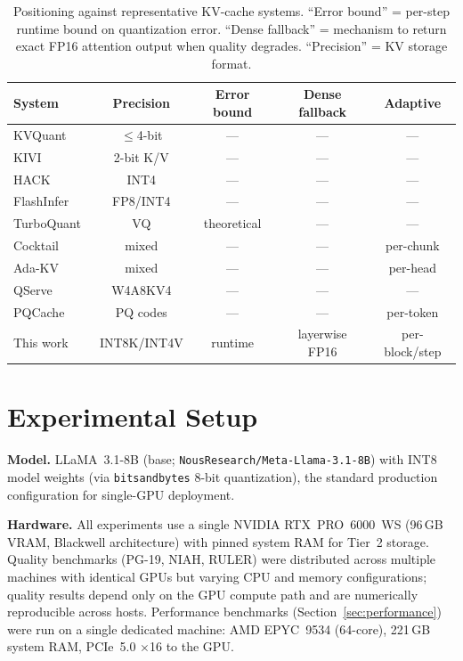 \documentclass[10pt,twocolumn,a4paper]{article}
\theoremstyle{definition}
\theoremstyle{remark}
\begin{document}
\begin{table}[!t]
\centering
\caption{Positioning against representative KV-cache systems.  ``Error bound'' = per-step runtime bound on quantization error.  ``Dense fallback'' = mechanism to return exact FP16 attention output when quality degrades.  ``Precision'' = KV storage format.}
\label{tab:positioning}
\small
\begin{tabular}{lcccc}
\toprule
\textbf{System} & \textbf{Precision} & \textbf{Error bound} & \textbf{Dense fallback} & \textbf{Adaptive} \\
\midrule
KVQuant~\cite{kvquant} & $\leq$4-bit & --- & --- & --- \\
KIVI~\cite{kivi} & 2-bit K/V & --- & --- & --- \\
HACK~\cite{hack} & INT4 & --- & --- & --- \\
FlashInfer~\cite{flashinfer} & FP8/INT4 & --- & --- & --- \\
TurboQuant~\cite{turboquant} & VQ & theoretical & --- & --- \\
Cocktail~\cite{cocktail} & mixed & --- & --- & per-chunk \\
Ada-KV~\cite{adakv} & mixed & --- & --- & per-head \\
QServe~\cite{qserve} & W4A8KV4 & --- & --- & --- \\
PQCache~\cite{pqcache} & PQ codes & --- & --- & per-token \\
\midrule
This work & INT8K/INT4V & runtime & layerwise FP16 & per-block/step \\
\bottomrule
\end{tabular}
\end{table}

\section{Experimental Setup}
\label{sec:setup}

\textbf{Model.}  LLaMA~3.1-8B (base; \texttt{NousResearch/Meta-Llama-3.1-8B}) with INT8 model weights (via \texttt{bitsandbytes} 8-bit quantization), the standard production configuration for single-GPU deployment.

\textbf{Hardware.}  All experiments use a single NVIDIA RTX~PRO~6000~WS (96\,GB VRAM, Blackwell architecture) with pinned system RAM for Tier~2 storage.  Quality benchmarks (PG-19, NIAH, RULER) were distributed across multiple machines with identical GPUs but varying CPU and memory configurations; quality results depend only on the GPU compute path and are numerically reproducible across hosts.  Performance benchmarks (Section~\ref{sec:performance}) were run on a single dedicated machine: AMD EPYC~9534 (64-core), 221\,GB system RAM, PCIe~5.0 $\times$16 to the GPU.
\end{document}
